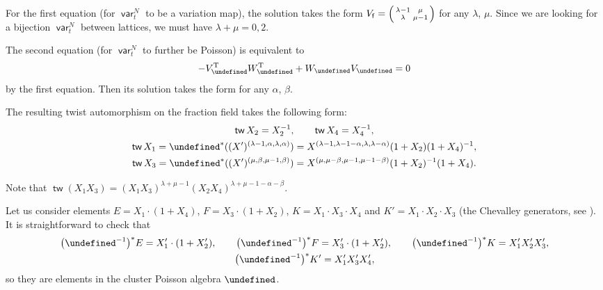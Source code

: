 \documentclass[10pt,a4paper]{amsart}
\renewcommand{\tilde}[1]{\widetilde{#1}}
\newcommand{\opname}[1]{\operatorname{\mathsf{#1}}}
\newcommand{\tw}{{\tilde{w}}}
\newcommand{\var}{\opname{var}}
\newcommand{\fv}{\opname{f}}
\newcommand{\ufv}{\opname{uf}}
\let\XClAlg\undefined
\let\seq\undefined
\let\high\undefined
\let\low\undefined
\renewcommand{\tw}{\opname{tw}}
\newcommand{\XClAlg}{\mathcal{U}^X}
\newcommand{\seq}{\boldsymbol{\mu}}%
\renewcommand{\tw}{\opname{tw}}
\newcommand{\high}{\opname{\ufv,\fv}}
\newcommand{\low}{\opname{\fv,\ufv}}
\numberwithin{equation}{section}
\begin{document}
\begin{Example}
For the first equation (for $\var_{t}^{N}$ to be a variation map),
the solution takes the form $V_{\fv}=\smash{\left(\begin{smallmatrix}
\lambda-1 & \mu\\
\lambda & \mu-1
\end{smallmatrix}\right)}$ for any $\lambda$, $\mu$. Since we are looking for a bijection $\var_{t}^{N}$
between lattices, we must have $\lambda+\mu=0,2$.

The second equation (for $\var_{t}^{N}$ to further be Poisson) is
equivalent to \[-V_{\high}^{\rm T}W_{\low}^{\rm T}+W_{\low}V_{\high}=0\] by
the first equation. Then its solution takes the form \smash{$V_{\high}=\left(\begin{smallmatrix}
\alpha & \beta\\
\alpha & \beta
\end{smallmatrix}\right)$} for any $\alpha$, $\beta$.

The resulting twist automorphism on the fraction field takes the following
form:
\begin{gather*}
\tw X_{2} =X_{2}^{-1},\qquad
\tw X_{4} =X_{4}^{-1},\\
\tw X_{1} =\seq^{*}((X')^{(\lambda-1,\alpha,\lambda,\alpha)})=X^{(\lambda-1,\lambda-1-\alpha,\lambda,\lambda-\alpha)}(1+X_{2})(1+X_{4})^{-1},\\
\tw X_{3} =\seq^{*}((X')^{(\mu,\beta,\mu-1,\beta)})=X^{(\mu,\mu-\beta,\mu-1,\mu-1-\beta)}(1+X_{2})^{-1}(1+X_{4}).
\end{gather*}

Note that $\tw(X_{1}X_{3})=(X_{1}X_{3})^{\lambda+\mu-1}(X_{2}X_{4})^{\lambda+\mu-1-\alpha-\beta}$.

Let us consider elements $E=X_{1}\cdot(1+X_{4})$, $F=X_{3}\cdot(1+X_{2})$,
$K=X_{1}\cdot X_{3}\cdot X_{4}$ and $K'=X_{1}\cdot X_{2}\cdot X_{3}$
(the Chevalley generators, see \cite{schrader2019cluster}). It is
straightforward to check that
\begin{gather*}
\big(\seq^{-1}\big)^{*}E=X_{1}'\cdot(1+X_{2}'),\qquad \big(\seq^{-1}\big)^{*}F=X_{3}'\cdot(1+X_{2}'), \qquad\big(\seq^{-1}\big)^{*}K=X_{1}'X_{2}'X_{3}',\\
\big(\seq^{-1}\big)^{*}K'=X_{1}'X_{3}'X_{4}',
\end{gather*}
 so they are elements in the
cluster Poisson algebra $\XClAlg$.


\end{Example}
\end{document}
